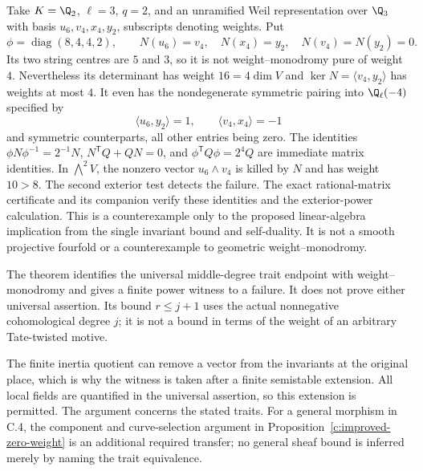 \begin{example}
\label{c:single-endpoint-insufficient}
Take $K=\Q_2$, $\ell=3$, $q=2$, and an unramified Weil
representation over $\Q_3$ with basis
$u_6,v_4,x_4,y_2$, subscripts denoting weights.  Put
\[
 \phi=\operatorname{diag}(8,4,4,2),\qquad
 N(u_6)=v_4,\quad N(x_4)=y_2,\quad N(v_4)=N(y_2)=0.
\]
Its two string centres are $5$ and $3$, so it is not
weight--monodromy pure of weight $4$.  Nevertheless
its determinant has weight $16=4\dim V$ and
$\ker N=\langle v_4,y_2\rangle$ has weights at most $4$.
It even has the nondegenerate symmetric pairing into
$\Q_\ell(-4)$ specified by
\[
 \langle u_6,y_2\rangle=1,\qquad
 \langle v_4,x_4\rangle=-1
\]
and symmetric counterparts, all other entries being zero.
The identities $\phi N\phi^{-1}=2^{-1}N$,
$N^{\mathsf T}Q+QN=0$, and
$\phi^{\mathsf T}Q\phi=2^4Q$ are immediate matrix identities.
In $\bigwedge^2V$, the nonzero vector $u_6\wedge v_4$
is killed by $N$ and has weight $10>8$.
The second exterior test detects the failure.
The exact rational-matrix certificate
and its companion
verify these identities and the exterior-power calculation.
This is a counterexample only to the proposed linear-algebra
implication from the single invariant bound and self-duality.
It is not a smooth projective fourfold or a counterexample
to geometric weight--monodromy.
\end{example}

\begin{remark}
\label{c:trait-exterior-scope}
The theorem identifies the universal middle-degree trait
endpoint with weight--monodromy and gives a finite power
witness to a failure.  It does not prove either universal
assertion.  Its bound $r\leq j+1$ uses the actual nonnegative
cohomological degree $j$; it is not a bound in terms of the
weight of an arbitrary Tate-twisted motive.

The finite inertia quotient can remove a vector from the
invariants at the original place, which is why the witness
is taken after a finite semistable extension.  All local fields
are quantified in the universal assertion, so this extension
is permitted.  The argument concerns the stated traits.
For a general morphism in C.4, the component and curve-selection
argument in Proposition~\ref{c:improved-zero-weight} is an
additional required transfer; no general sheaf bound is
inferred merely by naming the trait equivalence.
\end{remark}
